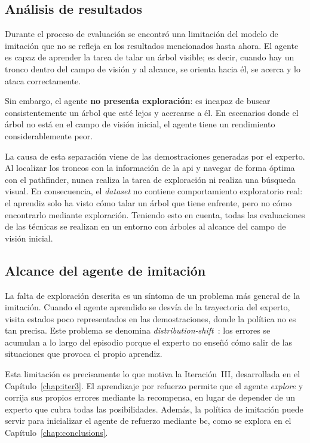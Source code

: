 \subsection{Análisis de resultados}
\label{sec:il-sin-exploracion}
Durante el proceso de evaluación se encontró una limitación del modelo de imitación
que no se refleja en los resultados mencionados hasta ahora. El agente es capaz de
aprender la tarea de talar un árbol visible; es decir, cuando hay un tronco dentro del campo de
visión y al alcance, se orienta hacia él, se acerca y lo ataca correctamente.

Sin embargo, el agente \textbf{no presenta exploración}: es incapaz de buscar consistentemente
un árbol que esté lejos y acercarse a él. En escenarios donde el árbol no está en el campo de visión inicial,
el agente tiene un rendimiento considerablemente peor.

La causa de esta separación viene de las demostraciones generadas por el experto. Al 
localizar los troncos con la información de la \acrshort{api} y navegar de forma
óptima con el \gls{pathfinder}, nunca realiza la tarea de exploración ni realiza una búsqueda 
visual. En consecuencia, el \textit{dataset} no contiene
comportamiento exploratorio real: el aprendiz solo ha visto cómo talar
un árbol que tiene enfrente, pero no cómo encontrarlo mediante exploración. 
Teniendo esto en cuenta, todas las evaluaciones de las técnicas se realizan en un entorno
con árboles al alcance del campo de visión inicial.

\subsection{Alcance del agente de imitación}
La falta de exploración descrita es un síntoma de un problema más general de la imitación.
Cuando el agente aprendido se desvía de la trayectoria del experto, visita estados poco
representados en las demostraciones, donde la política no es tan precisa. Este problema se
denomina \textit{\gls{distribution-shift}}~\cite{DBLP:journals/jmlr/RossGB11}: los errores se
acumulan a lo largo del episodio porque el experto no enseñó cómo salir de las situaciones
que provoca el propio aprendiz.

Esta limitación es precisamente lo que motiva la Iteración~III, desarrollada en el Capítulo~\ref{chap:iter3}.
El aprendizaje por refuerzo permite que el agente \emph{explore} y corrija sus propios 
errores mediante la recompensa, en lugar de depender de un experto que cubra todas las posibilidades. 
Además, la política de imitación puede servir para inicializar el agente de refuerzo
mediante \gls{bc}, como se explora en el Capítulo~\ref{chap:conclusions}.